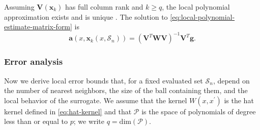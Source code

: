 Assuming $\mathbf{V}(\boldsymbol{x}_k)$ has full column rank and $k \geq q$, the local polynomial approximation exists and is unique \citep{Kohler2002,Stone1977}. The solution to \eqref{eq:local-polynomial-estimate-matrix-form} is 
\begin{equation}
    \mathbf{a}(x, \boldsymbol{x}_k(x, \mathcal{S}_n)) = (\mathbf{V}^T \mathbf{W} \mathbf{V})^{-1} \mathbf{V}^T \mathbf{g}.
\end{equation}

\subsubsection{Error analysis}
\label{sec:erroranalysis}

Now we derive local error bounds that, for a fixed evaluated set $\mathcal{S}_n$, depend on the number of nearest neighbors, the size of the ball containing them, and the local behavior of the surrogate. We assume that the kernel $W(x, x^{\prime})$ is the hat kernel defined in \eqref{eq:hat-kernel} and that $\mathcal{P}$ is the space of polynomials of degree less than or equal to $p$; 
we write $q = \text{dim}( \mathcal{P})$. 

